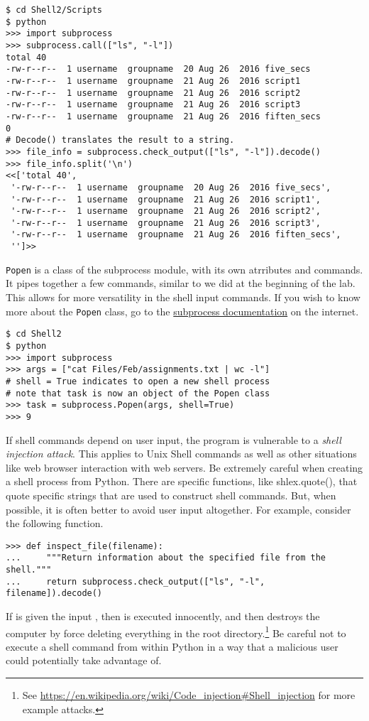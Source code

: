 \begin{lstlisting}
$ cd Shell2/Scripts
$ python
>>> import subprocess
>>> subprocess.call(["ls", "-l"])
total 40
-rw-r--r--  1 username  groupname  20 Aug 26  2016 five_secs
-rw-r--r--  1 username  groupname  21 Aug 26  2016 script1
-rw-r--r--  1 username  groupname  21 Aug 26  2016 script2
-rw-r--r--  1 username  groupname  21 Aug 26  2016 script3
-rw-r--r--  1 username  groupname  21 Aug 26  2016 fiften_secs
0                               
# Decode() translates the result to a string.
>>> file_info = subprocess.check_output(["ls", "-l"]).decode()
>>> file_info.split('\n')
<<['total 40',
 '-rw-r--r--  1 username  groupname  20 Aug 26  2016 five_secs',
 '-rw-r--r--  1 username  groupname  21 Aug 26  2016 script1',
 '-rw-r--r--  1 username  groupname  21 Aug 26  2016 script2',
 '-rw-r--r--  1 username  groupname  21 Aug 26  2016 script3',
 '-rw-r--r--  1 username  groupname  21 Aug 26  2016 fiften_secs',
 '']>>
\end{lstlisting}

\texttt{Popen} is a class of the subprocess module, with its own atrributes and commands.
It pipes together a few commands, similar to we did at the beginning of the lab. 
This allows for more versatility in the shell input commands.
If you wish to know more about the \texttt{Popen} class, go to the \href{https://docs.python.org/3/library/subprocess.html}{subprocess documentation} on the internet. 


\begin{lstlisting}
$ cd Shell2
$ python
>>> import subprocess
>>> args = ["cat Files/Feb/assignments.txt | wc -l"]
# shell = True indicates to open a new shell process
# note that task is now an object of the Popen class
>>> task = subprocess.Popen(args, shell=True)
>>> 9
\end{lstlisting}

\begin{warn}
If shell commands depend on user input, the program is vulnerable to a \emph{shell injection attack}.
This applies to Unix Shell commands as well as other situations like web browser interaction with web servers.
Be extremely careful when creating a shell process from Python.
There are specific functions, like shlex.quote(), that quote specific strings that are used to construct shell commands.
But, when possible, it is often better to avoid user input altogether.
For example, consider the following function.
\begin{lstlisting}
>>> def inspect_file(filename):
...     """Return information about the specified file from the shell."""
...     return subprocess.check_output(["ls", "-l", filename]).decode()
\end{lstlisting}
If  is given the input , then  is executed innocently, and then  destroys the computer by force deleting everything in the root directory.\footnote{See \url{https://en.wikipedia.org/wiki/Code_injection\#Shell_injection} for more example attacks.}
Be careful not to execute a shell command from within Python in a way that a malicious user could potentially take advantage of.
\end{warn}


